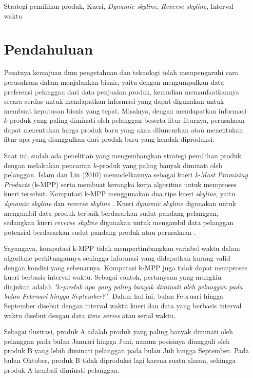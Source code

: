\documentclass[conference]{IEEEtran}
\begin{document}
\begin{IEEEkeywords}
Strategi pemilihan produk, Kueri, \textit{Dynamic skyline}, \textit{Reverse skyline}, Interval waktu
\end{IEEEkeywords}

\section{Pendahuluan}
Pesatnya kemajuan ilmu pengetahuan dan teknologi telah mempengaruhi cara perusahaan dalam menjalankan bisnis, yaitu dengan mengumpulkan data preferensi pelanggan dari data penjualan produk, kemudian memanfaatkannya secara cerdas untuk mendapatkan informasi yang dapat digunakan untuk membuat keputusan bisnis yang tepat. Misalnya, dengan mendapatkan informasi $k$-produk yang paling diminati oleh pelanggan beserta fitur-fiturnya, perusahaan dapat menentukan harga produk baru yang akan diluncurkan atau menentukan fitur apa yang diunggulkan dari produk baru yang hendak diproduksi. 

Saat ini, sudah ada penelitian yang mengembangkan strategi pemilihan produk dengan melakukan pencarian $k$-produk yang paling banyak diminati oleh pelanggan. Islam dan Liu (2010) memodelkannya sebagai kueri \textit{k-Most Promising Products} (k-MPP) \cite{kmpp} serta membuat kerangka kerja algoritme untuk memproses kueri tersebut. Komputasi k-MPP menggunakan dua tipe kueri \textit{skyline}, yaitu \textit{dynamic skyline} \cite{dynamic-skyline} dan \textit{reverse skyline} \cite{reverse-skyline}. Kueri \textit{dynamic skyline} digunakan untuk mengambil data produk terbaik berdasarkan sudut pandang pelanggan, sedangkan kueri \textit{reverse skyline} digunakan untuk mengambil data pelanggan potensial berdasarkan sudut pandang produk atau perusahaan \cite{kmpp}.

Sayangnya, komputasi k-MPP tidak mempertimbangkan variabel waktu dalam algoritme perhitungannya sehingga informasi yang didapatkan kurang valid dengan kondisi yang sebenarnya. Komputasi k-MPP juga tidak dapat memproses kueri berbasis interval waktu. Sebagai contoh, pertanyaan yang mungkin diajukan adalah \textit{"$k$-produk apa yang paling banyak diminati oleh pelanggan pada bulan Februari hingga September?"}. Dalam hal ini, bulan Februari hingga September disebut dengan interval waktu kueri dan data yang berbasis interval waktu disebut dengan data \textit{time series} atau serial waktu.

Sebagai ilustrasi, produk A adalah produk yang paling banyak diminati oleh pelanggan pada bulan Januari hingga Juni, namun posisinya diungguli oleh produk B yang lebih diminati pelanggan pada bulan Juli hingga September. Pada bulan Oktober, produk B tidak diproduksi lagi karena suatu alasan, sehingga produk A kembali diminati pelanggan. 
\end{document}
